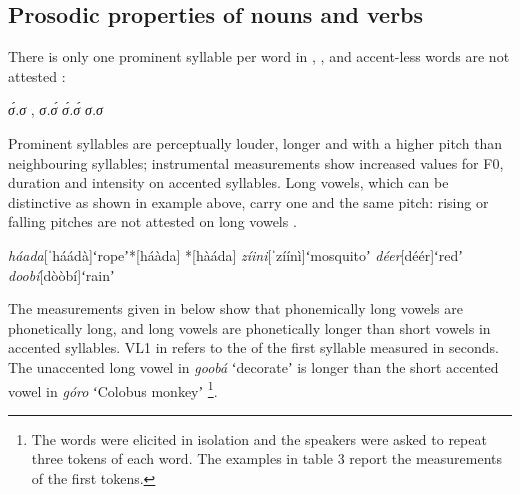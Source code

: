 \documentclass[output=paper]{LSP/langsci}
\begin{document}
\subsection{Prosodic properties of nouns and verbs} \label{sec:Petrollino:stress}   
There is only one prominent syllable per word in  , , and accent-less words are not attested :
\begin{exe}
\ex  \begin{xlist} \label{ex:Petrollino:obligatorinessculminativity}
\ex  \textit{σ́.σ}  ,  \textit{σ.σ́} \label{ex:Petrollino:σ}
\ex *\textit{σ́.σ́}  \label{ex:Petrollino:σσ}
\ex *\textit{σ.σ} \label{ex:Petrollino:σσσ}
\end{xlist}
\end{exe}
Prominent syllables are perceptually louder, longer and with a higher pitch than neighbouring syllables; instrumental measurements show increased values for F0, duration and intensity on accented syllables. Long vowels, which can be distinctive as shown in example  above, carry one and the same pitch: rising or falling pitches are not attested on long vowels .
\begin{exe}
	\ex \begin{xlist}
	\ex \textit{háada}\hspace{7mm}[ˈháádà]\hspace{4mm}ʻropeʼ\hspace{10mm}*[háàda] *[hàáda]
    \ex \textit{zíini}\hspace{10mm}[ˈzíínì]\hspace{6mm}ʻmosquitoʼ\hspace{3mm}
    \ex \textit{déer}\hspace{11mm}[déér]\hspace{7mm}ʻredʼ\hspace{12mm}
	\ex \textit{doobí}\hspace{9mm}[dòòbí]\hspace{5mm}ʻrainʼ\hspace{12mm}
    \end{xlist} \label{ex:Petrollino:nocontour}
\end{exe}
The measurements given in  below show that phonemically long vowels are phonetically long, and long vowels are phonetically longer than short vowels in accented syllables. VL1 in  refers to the  of the first syllable measured in seconds. The unaccented long vowel in \textit{goobá} ʻdecorateʼ is longer than the short accented vowel in \textit{góro} ʻColobus monkeyʼ \footnote{The words were  elicited in isolation and the speakers were asked to repeat three tokens of each word. The examples in table 3 report the measurements of the first tokens.}.\newline
\end{document}
